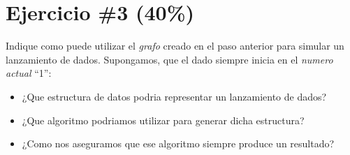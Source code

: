 \documentclass{article}
\begin{document}
\section*{Ejercicio \#3 (40\%)}
Indique como puede utilizar el \emph{grafo} creado en el paso anterior para simular
un lanzamiento de dados. Supongamos, que el dado siempre inicia en el \emph{numero actual}
``1'':
\begin{itemize}
        \item{¿Que estructura de datos podria representar un lanzamiento de dados?}
        \item{¿Que algoritmo podriamos utilizar para generar dicha estructura?}
        \item{¿Como nos aseguramos que ese algoritmo siempre produce un resultado?}
\end{itemize}
\end{document}
